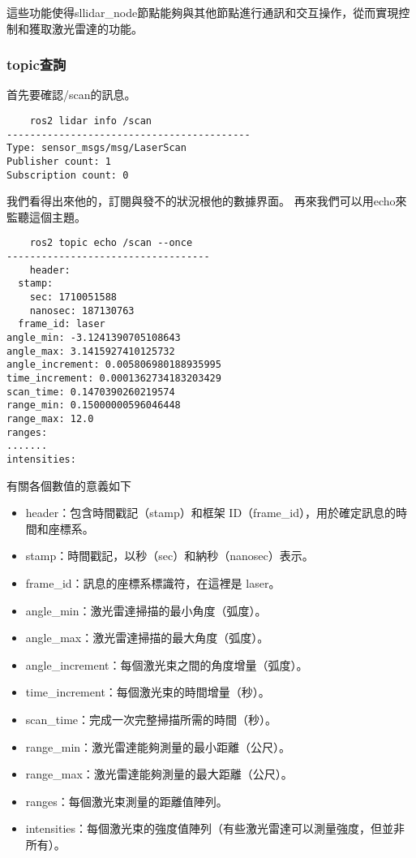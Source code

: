 這些功能使得sllidar\_node節點能夠與其他節點進行通訊和交互操作，從而實現控制和獲取激光雷達的功能。

\subsubsection{topic查詢}
首先要確認/scan的訊息。
\begin{tcolorbox}
\begin{verbatim}
    ros2 lidar info /scan
------------------------------------------
Type: sensor_msgs/msg/LaserScan
Publisher count: 1
Subscription count: 0
\end{verbatim}
\end{tcolorbox}
我們看得出來他的，訂閱與發不的狀況根他的數據界面。
再來我們可以用echo來監聽這個主題。
\begin{tcolorbox}
\begin{verbatim}
    ros2 topic echo /scan --once
-----------------------------------
    header:
  stamp:
    sec: 1710051588
    nanosec: 187130763
  frame_id: laser
angle_min: -3.1241390705108643
angle_max: 3.1415927410125732
angle_increment: 0.005806980188935995
time_increment: 0.0001362734183203429
scan_time: 0.1470390260219574
range_min: 0.15000000596046448
range_max: 12.0
ranges:
.......
intensities:
\end{verbatim}
\end{tcolorbox}
有關各個數值的意義如下
\begin{itemize}
    \item header：包含時間戳記（stamp）和框架 ID（frame\_id），用於確定訊息的時間和座標系。
    \item stamp：時間戳記，以秒（sec）和納秒（nanosec）表示。
    \item frame\_id：訊息的座標系標識符，在這裡是 laser。
    \item angle\_min：激光雷達掃描的最小角度（弧度）。
    \item angle\_max：激光雷達掃描的最大角度（弧度）。
    \item angle\_increment：每個激光束之間的角度增量（弧度）。
    \item time\_increment：每個激光束的時間增量（秒）。
    \item scan\_time：完成一次完整掃描所需的時間（秒）。
    \item range\_min：激光雷達能夠測量的最小距離（公尺）。
    \item range\_max：激光雷達能夠測量的最大距離（公尺）。
    \item ranges：每個激光束測量的距離值陣列。
    \item intensities：每個激光束的強度值陣列（有些激光雷達可以測量強度，但並非所有）。
\end{itemize}

